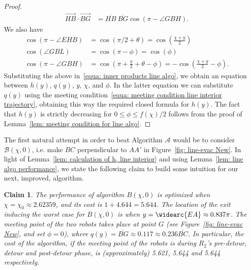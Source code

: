 \documentclass[
final
]{dmtcs-episciences}
\newcommand{\barr}[1]{\overline{#1}}
\newcommand{\vect}[1]{\overrightarrow{#1}}
\newcommand{\coss}[1]{\cos \left({#1}\right)}
\newcommand{\RB}{\ensuremath{R_2 }}
\newcommand{\arccc}[1]{
\widearc{#1}
}
\newcommand{\ignore}[1]{}
\newtheorem{claim}[theorem]{Claim}
\theoremstyle{definition}
\begin{document}
\begin{proof}
\begin{align*}
\vect{HB}\cdot\vect{BG} &=
\barr{HB} ~\barr{BG} \coss{\pi- \angle{GBH}}.
\end{align*}
We also have
\begin{align*}
\coss{\pi - \angle{EHB}}&=\coss{\pi/2+\theta}= \coss{\frac{\chi+y}2}
\\
\coss{\angle{GBL}} &=\coss{\pi-\phi}=\coss{\phi}
\\
\coss{\pi- \angle{GBH}} &= \coss{\pi +\frac\pi2+\theta - \phi}=
-\coss{\frac{\chi+y}2 - \phi}.
\end{align*}
Substituting the above in~\eqref{equa: inner products line algo}, we obtain an equation between $h(y)$, $q(y)$, $y$, $\chi$, and $\phi$. 
In the latter equation we can substitute $q(y)$ using the meeting condition~\eqref{equa: meeting condition line interior trajectory}, obtaining this way the required closed formula for $h(y)$.
The fact that $h(y)$ is strictly decreasing for $0\leq \phi \leq f(\chi)/2$ follows from the proof of Lemma~\ref{lem: meeting condition for line algo}.
\end{proof}

The first natural attempt in order to beat Algorithm $\mathcal A$ would be to consider $\mathcal B(\chi, 0)$, i.e. make $BC$ perpendicular to $AA'$ in Figure~\ref{fig: line-evac New}. In light of Lemma~\ref{lem: calculation of h, line interior} and using Lemma~\ref{lem: line algo performance}, we state the following claim to build some intuition for our next, improved, algorithm. 

\begin{claim}\label{claim: phi=0, line algo performance}
The performance of algorithm $B(\chi, 0)$ is optimized when $\chi=\chi_0\approx2.62359$, and its cost is $1+4.644=5.644$.
The location of the exit inducing the worst case for $B(\chi, 0)$ is when $y= \arccc{EA} \approx 0.837 \pi$. The meeting point of the two robots takes place at point $G$ (see Figure~\ref{fig: line-evac New}, and set $\phi=0$), where $q(y)= \barr{BG} \approx 0.117 \approx 0.236 \barr {BC}$. In particular, the cost of the algorithm, if the meeting point of the robots is during \RB's \textit{pre-detour}, \textit{detour} and \textit{post-detour} phase, is (approximately) 5.621, 5.644 and 5.644 respectively. \end{claim}

\ignore{
 (*Mathematica code*)
xx = 2.62359;
f[x_] := z /. FindRoot[ z == 2*Sin[x - z/2], {z, 1}];
Hp[x_, y_, 
   phi_] := (x^2 - 2 x y + y^2 + 4 Sin[(x - y)/2]^2 + 
     4 (x - y) Cos[phi] Sin[y] + 4 Sin[x] Sin[y] + 
     4 (x - y) Sin[(x - y)/2] Sin[
       phi + ArcSin[Cos[(x + y)/2]]])/(2 (x - y + 2 Cos[phi] Sin[y] + 
       2 Sin[(x - y)/2] Sin[phi + ArcSin[Cos[(x + y)/2]]]));

NMaximize[ {y + 2*Hp[xx, y, 0], y >= xx - f[xx], y <= xx}, y]

yy = 0.8366130642397082;
yy + Hp[xx, yy, 0] - xx  (*this is q*)
}
\end{document}
